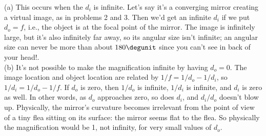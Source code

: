 (a) This occurs when the $d_i$ is infinite. Let's say
it's a converging mirror creating a virtual image, as in
problems 2 and 3. Then we'd get an infinite $d_i$ if we put
$d_o=f$, i.e., the object is at the focal point of the
mirror. The image is infinitely large, but it's also
infinitely far away, so its angular size isn't infinite; an angular
size can never be more than about $180\degunit$ since
you can't see in back of your head!.\\
(b) It's not possible to make the magnification infinite by
having $d_o=0$. The image location and object location are
related by $1/f=1/d_o-1/d_i$, so $1/d_i=1/d_o-1/f$. If $d_o$
is zero, then $1/d_o$ is infinite, $1/d_i$ is infinite, and
$d_i$ is zero as well. In other words, as $d_o$ approaches
zero, so does $d_i$, and $d_i/d_o$ doesn't blow up.
Physically, the mirror's curvature becomes irrelevant from the
point of view of a tiny flea sitting on its surface: the
mirror seems flat to the flea. So physically the magnification
would be 1, not infinity, for very small values of $d_o$.
